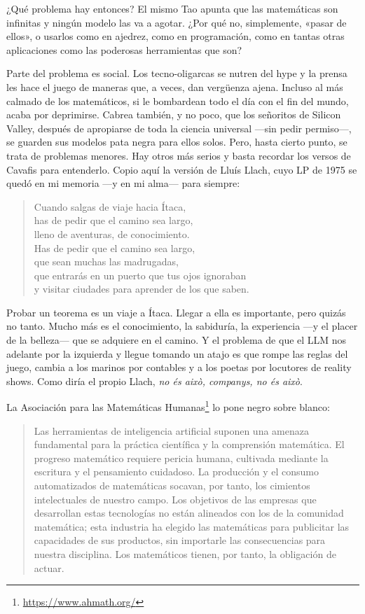 \documentclass[11pt,a4paper]{article}
\begin{document}
¿Qué problema hay entonces? El mismo Tao apunta que las matemáticas son infinitas y ningún modelo las va a agotar. ¿Por qué no, simplemente, «pasar de ellos», o usarlos como en ajedrez, como en programación, como en tantas otras aplicaciones como las poderosas herramientas que son?

Parte del problema es social. Los tecno-oligarcas se nutren del hype y la prensa les hace el juego de maneras que, a veces, dan vergüenza ajena. Incluso al más calmado de los matemáticos, si le bombardean todo el día con el fin del mundo, acaba por deprimirse. Cabrea también, y no poco, que los señoritos de Silicon Valley, después de apropiarse de toda la ciencia universal ---sin pedir permiso---, se guarden sus modelos pata negra para ellos solos. Pero, hasta cierto punto, se trata de problemas menores. Hay otros más serios y basta recordar los versos de Cavafis para entenderlo. Copio aquí la versión de Lluís Llach, cuyo LP de 1975 se quedó en mi memoria ---y en mi alma--- para siempre:

\begin{verse}
Cuando salgas de viaje hacia Ítaca,\\
has de pedir que el camino sea largo,\\
lleno de aventuras, de conocimiento.\\
Has de pedir que el camino sea largo,\\
que sean muchas las madrugadas,\\
que entrarás en un puerto que tus ojos ignoraban\\
y visitar ciudades para aprender de los que saben.
\end{verse}

Probar un teorema es un viaje a Ítaca. Llegar a ella es importante, pero quizás no tanto. Mucho más es el conocimiento, la sabiduría, la experiencia ---y el placer de la belleza--- que se adquiere en el camino. Y el problema de que el LLM nos adelante por la izquierda y llegue tomando un atajo es que rompe las reglas del juego, cambia a los marinos por contables y a los poetas por locutores de reality shows. Como diría el propio Llach, \emph{no és això, companys, no és això}.

La Asociación para las Matemáticas Humanas\footnote{\url{https://www.ahmath.org/}} lo pone negro sobre blanco:

\begin{quotation}
Las herramientas de inteligencia artificial suponen una amenaza fundamental para la práctica científica y la comprensión matemática. El progreso matemático requiere pericia humana, cultivada mediante la escritura y el pensamiento cuidadoso. La producción y el consumo automatizados de matemáticas socavan, por tanto, los cimientos intelectuales de nuestro campo. Los objetivos de las empresas que desarrollan estas tecnologías no están alineados con los de la comunidad matemática; esta industria ha elegido las matemáticas para publicitar las capacidades de sus productos, sin importarle las consecuencias para nuestra disciplina. Los matemáticos tienen, por tanto, la obligación de actuar.
\end{quotation}
\end{document}
